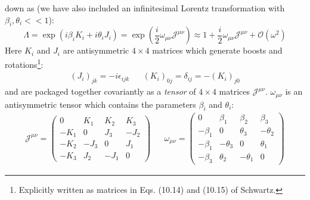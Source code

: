 \documentclass[12pt]{article}
\theoremstyle{mytheorem}
\begin{document}
\begin{itemize}
	down as (we have also included an infinitesimal Lorentz transformation with $\beta_i, \theta_i << 1$):
	\begin{equation}
		\Lambda = \exp(i\beta_i K_i + i \theta_i J_i) = \exp\left(\frac{i}{2}\omega_{\mu\nu} \mathcal{J}^{\mu\nu}\right)\approx 1 + \frac{i}{2}\omega_{\mu\nu} \mathcal J^{\mu\nu} + \mathcal O(\omega^2)
		\label{eq:general_lorentz}
	\end{equation}
	Here $K_i$ and $J_i$ are antisymmetric $4\times 4$ matrices which generate boosts and rotations\footnote{Explicitly 
	written as matrices in Eqs. (10.14) and (10.15) of Schwartz.}:
	\begin{align}
		(J_i)_{jk} = -i \epsilon_{ijk} && (K_i)_{0j} = \delta_{ij} = - (K_i)_{j0}
	\end{align}
	and are packaged together covariantly as a \textit{tensor} of $4\times 4$ matrices $\mathcal J^{\mu\nu}$. 
	$\omega_{\mu\nu}$ is an antisymmetric tensor which contains the parameters $\beta_i$ and $\theta_i$:
		\begin{align}
		\mathcal J^{\mu\nu} = \begin{pmatrix} 0 & K_1 & K_2 & K_3 \\ -K_1 & 0 & J_3 & -J_2 \\ -K_2 & -J_3 & 0 & J_1 \\ -K_3 & J_2 & -J_1 & 0 \end{pmatrix} &&
		\omega_{\mu\nu} = \begin{pmatrix} 0 & \beta_1 & \beta_2 & \beta_3 \\ -\beta_1 & 0 & \theta_3 & -\theta_2 \\ -\beta_1 & -\theta_3 & 0 & \theta_1 \\ 
		-\beta_3 & \theta_2 & -\theta_1 & 0 \end{pmatrix}
	\end{align}


\end{itemize}
\end{document}
